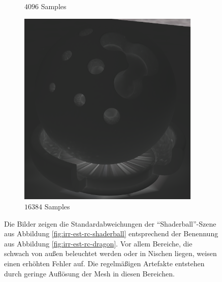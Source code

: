 \begin{figure}[h]
\begin{subfigure}[b]{0.33\textwidth}
				\caption{$4096$ Samples}
			\end{subfigure}
			\begin{subfigure}[b]{0.33\textwidth}
				\center
				\includegraphics[width=0.95\textwidth]{pic/irr_est-rc-shaderball2-s16384-err.png}
				\caption{$16384$ Samples}
			\end{subfigure}
			\caption[Fehler der Vertex-Irradiance-Map anhand der \enquote{Shaderball}-Szene]{Die Bilder zeigen die Standardabweichungen der \enquote{Shaderball}-Szene aus Abbildung \ref{fig:irr-est-rc-shaderball} entsprechend der Benennung aus Abbildung \ref{fig:irr-est-rc-dragon}. Vor allem Bereiche, die schwach von außen beleuchtet werden oder in Nischen liegen, weisen einen erhöhten Fehler auf. Die regelmäßigen Artefakte entstehen durch geringe Auflösung der Mesh in diesen Bereichen.}
			\label{fig:irr-est-rc-shaderball-err}
		\end{figure}

